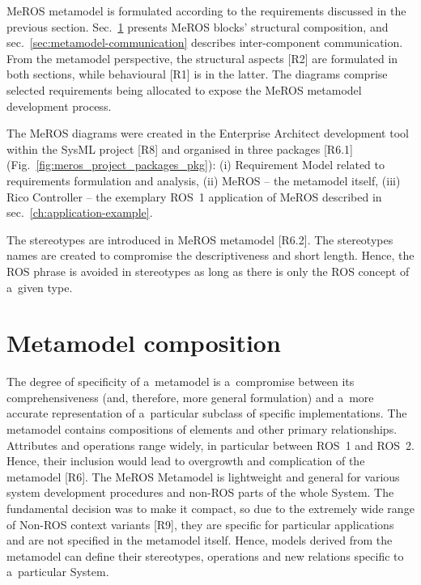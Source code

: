 \documentclass[11pt,oneside,a4paper]{report}
\begin{document}
	MeROS metamodel is formulated according to the requirements discussed in the previous section. Sec.~\ref{sec:metamodel-composition} presents MeROS blocks' structural composition, and sec.~\ref{sec:metamodel-communication} describes inter-component communication. From the metamodel perspective, the structural aspects [R2] are formulated in both sections, while behavioural [R1] is in the latter. The diagrams comprise selected requirements being allocated to expose the MeROS metamodel development process. 
	
	The MeROS diagrams were created in the Enterprise Architect development tool within the SysML project [R8] and organised in three packages [R6.1] (Fig.~\ref{fig:meros_project_packages_pkg}): (i) Requirement Model related to requirements formulation and analysis, (ii) MeROS -- the metamodel itself, (iii) Rico Controller -- the exemplary ROS~1 application of MeROS described in sec.~\ref{ch:application-example}. 
	
	
	
	The stereotypes are introduced in MeROS metamodel [R6.2].
	The stereotypes names are created to compromise the descriptiveness and short length. Hence, the ROS phrase is avoided in stereotypes as long as there is only the ROS concept of a~given type.
	
	
	
\section{Metamodel composition}
\label{sec:metamodel-composition}

	The degree of specificity of a~metamodel is a~compromise between its comprehensiveness (and, therefore, more general formulation) and a~more accurate representation of a~particular subclass of specific implementations. The metamodel contains compositions of elements and other primary relationships. Attributes and operations range widely, in particular between ROS~1 and ROS~2. Hence, their inclusion would lead to overgrowth and complication of the metamodel [R6]. The MeROS Metamodel is lightweight and general for various system development procedures and non-ROS parts of the whole System. The fundamental decision was to make it compact, so due to the extremely wide range of Non-ROS context variants [R9], they are specific for particular applications and are not specified in the metamodel itself.
	Hence, models derived from the metamodel can define their stereotypes, operations and new relations specific to a~particular System. 
	
\end{document}
